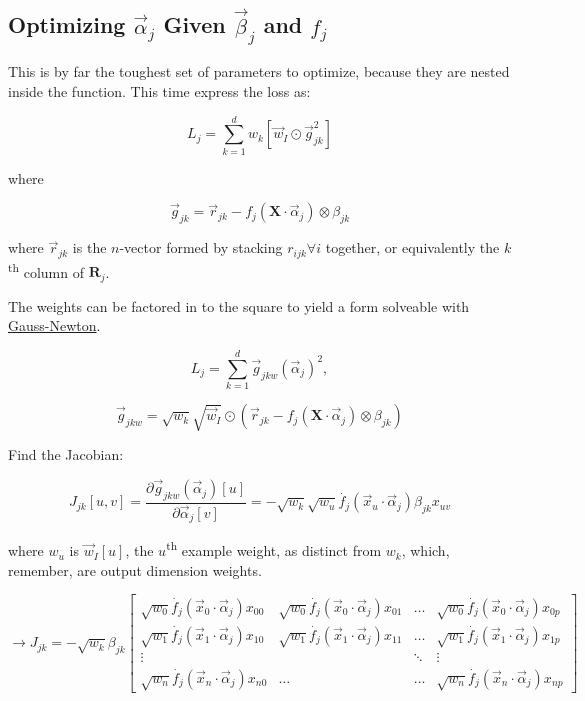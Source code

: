\documentclass[12pt]{article}
\begin{document}
\subsection{Optimizing $\vec{\alpha}_j$ Given $\vec{\beta}_j$ and $f_j$}

This is by far the toughest set of parameters to optimize, because they are nested inside the function. This time express the loss as:

$$L_j = \sum_{k=1}^d w_k [\vec{w}_I \odot \vec{g}_{jk}^2]$$

where

$$ \vec{g}_{jk} = \vec{r}_{jk} - f_j(\pmb{X} \cdot \vec{\alpha}_j) \otimes \beta_{jk}$$

where $\vec{r}_{jk}$ is the $n$-vector formed by stacking $r_{ijk} \forall i$ together, or equivalently the $k$\textsuperscript{th} column of $\pmb{R}_j$.

The weights can be factored in to the square to yield a form solveable with \href{https://en.wikipedia.org/wiki/Gauss%E2%80%93Newton_algorithm#Description}{Gauss-Newton}.

$$L_j = \sum_{k=1}^d \vec{g}_{jkw}(\vec{\alpha}_j)^2,$$

$$\vec{g}_{jkw} = \sqrt{w_k} \sqrt{\vec{w}_I} \odot (\vec{r}_{jk} - f_j(\pmb{X} \cdot \vec{\alpha}_j) \otimes \beta_{jk})$$

Find the Jacobian:

$$J_{jk}[u,v] = \frac{\partial \vec{g}_{jkw}(\vec{\alpha}_j)[u]}{\partial \vec{\alpha}_j[v]} = -\sqrt{w_k} \sqrt{w_u} \dot{f_j}(\vec{x}_u \cdot \vec{\alpha}_j) \beta_{jk} x_{uv}$$

where $w_u$ is $\vec{w}_I[u]$, the $u$\textsuperscript{th} example weight, as distinct from $w_k$, which, remember, are output dimension weights.

\[
\rightarrow J_{jk} = -\sqrt{w_k} \beta_{jk}
\begin{bmatrix}
	\sqrt{w_0} \dot{f_j}(\vec{x}_0 \cdot \vec{\alpha}_j) x_{00} & \sqrt{w_0} \dot{f_j}(\vec{x}_0 \cdot \vec{\alpha}_j) x_{01} & \dots & \sqrt{w_0} \dot{f_j}(\vec{x}_0 \cdot \vec{\alpha}_j) x_{0p} \\
    \sqrt{w_1} \dot{f_j}(\vec{x}_1 \cdot \vec{\alpha}_j) x_{10} & \sqrt{w_1} \dot{f_j}(\vec{x}_1 \cdot \vec{\alpha}_j) x_{11} & \dots & \sqrt{w_1} \dot{f_j}(\vec{x}_1 \cdot \vec{\alpha}_j) x_{1p}\\
    \vdots & & \ddots & \vdots\\
    \sqrt{w_n} \dot{f_j}(\vec{x}_n \cdot \vec{\alpha}_j) x_{n0} & \hdots & \hdots & \sqrt{w_n} \dot{f_j}(\vec{x}_n \cdot \vec{\alpha}_j) x_{np}
\end{bmatrix}
\]
\end{document}
